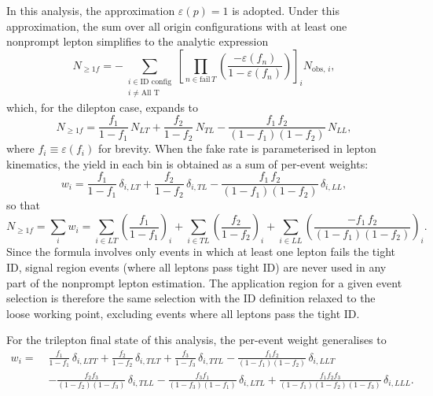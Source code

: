 In this analysis, the approximation $\varepsilon(p) = 1$ is adopted. Under this approximation, the sum over all origin configurations with at least one nonprompt lepton simplifies to the analytic expression~\cite{CMSFRMethod}
\begin{equation}
  N_{\geq 1f} = -\sum_{\substack{i\in\text{ID config}\\i\neq\text{All T}}}\left[\prod_{n\in\text{fail}\,T}\left(\frac{-\varepsilon(f_{n})}{1-\varepsilon(f_{n})}\right)\right]_{i} N_{\text{obs},\,i},
  \label{eq:fakerate_sum}
\end{equation}
which, for the dilepton case, expands to
\begin{equation}
  N_{\geq 1f} = \frac{f_{1}}{1-f_{1}}\,N_{LT} + \frac{f_{2}}{1-f_{2}}\,N_{TL} - \frac{f_{1}\,f_{2}}{(1-f_{1})(1-f_{2})}\,N_{LL},
  \label{eq:fakerate_dilep}
\end{equation}
where $f_{i} \equiv \varepsilon(f_{i})$ for brevity. When the fake rate is parameterised in lepton kinematics, the yield in each bin is obtained as a sum of per-event weights:
\begin{equation}
  w_{i} = \frac{f_{1}}{1-f_{1}}\,\delta_{i,LT} + \frac{f_{2}}{1-f_{2}}\,\delta_{i,TL} - \frac{f_{1}\,f_{2}}{(1-f_{1})(1-f_{2})}\,\delta_{i,LL},
  \label{eq:fakerate_weight}
\end{equation}
so that
\begin{equation}
  N_{\geq 1f} = \sum_{i} w_{i} = \sum_{i\in LT}\!\left(\frac{f_{1}}{1-f_{1}}\right)_{\!i} + \sum_{i\in TL}\!\left(\frac{f_{2}}{1-f_{2}}\right)_{\!i} + \sum_{i\in LL}\!\left(\frac{-f_{1}\,f_{2}}{(1-f_{1})(1-f_{2})}\right)_{\!i}.
  \label{eq:fakerate_yield}
\end{equation}
Since the formula involves only events in which at least one lepton fails the tight ID, signal region events (where all leptons pass tight ID) are never used in any part of the nonprompt lepton estimation. The application region for a given event selection is therefore the same selection with the ID definition relaxed to the loose working point, excluding events where all leptons pass the tight ID.

For the trilepton final state of this analysis, the per-event weight generalises to
\begin{align}
  w_{i} =\;& \frac{f_{1}}{1{-}f_{1}}\,\delta_{i,LTT} + \frac{f_{2}}{1{-}f_{2}}\,\delta_{i,TLT} + \frac{f_{3}}{1{-}f_{3}}\,\delta_{i,TTL}
           - \frac{f_{1}f_{2}}{(1{-}f_{1})(1{-}f_{2})}\,\delta_{i,LLT} \nonumber \\
          &- \frac{f_{2}f_{3}}{(1{-}f_{2})(1{-}f_{3})}\,\delta_{i,TLL}
           - \frac{f_{3}f_{1}}{(1{-}f_{3})(1{-}f_{1})}\,\delta_{i,LTL}
           + \frac{f_{1}f_{2}f_{3}}{(1{-}f_{1})(1{-}f_{2})(1{-}f_{3})}\,\delta_{i,LLL}.
  \label{eq:fakerate_trilep}
\end{align}

